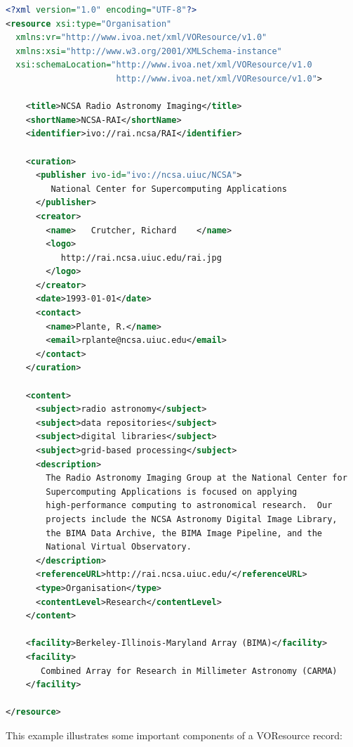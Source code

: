 \documentclass[11pt,a4paper]{ivoa}
\begin{document}
\begin{lstlisting}[language=XML,numbers=right,basicstyle=\footnotesize]
<?xml version="1.0" encoding="UTF-8"?>
<resource xsi:type="Organisation"
  xmlns:vr="http://www.ivoa.net/xml/VOResource/v1.0"
  xmlns:xsi="http://www.w3.org/2001/XMLSchema-instance"
  xsi:schemaLocation="http://www.ivoa.net/xml/VOResource/v1.0
                      http://www.ivoa.net/xml/VOResource/v1.0">

    <title>NCSA Radio Astronomy Imaging</title>
    <shortName>NCSA-RAI</shortName>
    <identifier>ivo://rai.ncsa/RAI</identifier>

    <curation>
      <publisher ivo-id="ivo://ncsa.uiuc/NCSA">
         National Center for Supercomputing Applications
      </publisher>
      <creator>
        <name>   Crutcher, Richard    </name>
        <logo>
           http://rai.ncsa.uiuc.edu/rai.jpg
        </logo>
      </creator>
      <date>1993-01-01</date>
      <contact>
        <name>Plante, R.</name>
      	<email>rplante@ncsa.uiuc.edu</email>
      </contact>
    </curation>

    <content>
      <subject>radio astronomy</subject>
      <subject>data repositories</subject>
      <subject>digital libraries</subject>
      <subject>grid-based processing</subject>
      <description>
        The Radio Astronomy Imaging Group at the National Center for
        Supercomputing Applications is focused on applying
        high-performance computing to astronomical research.  Our
        projects include the NCSA Astronomy Digital Image Library, 
        the BIMA Data Archive, the BIMA Image Pipeline, and the
        National Virtual Observatory. 
      </description>
      <referenceURL>http://rai.ncsa.uiuc.edu/</referenceURL>
      <type>Organisation</type>
      <contentLevel>Research</contentLevel>
    </content>

    <facility>Berkeley-Illinois-Maryland Array (BIMA)</facility>
    <facility>
       Combined Array for Research in Millimeter Astronomy (CARMA)
    </facility>

</resource>
\end{lstlisting}

This example illustrates some important components of a VOResource
record:
\end{document}
